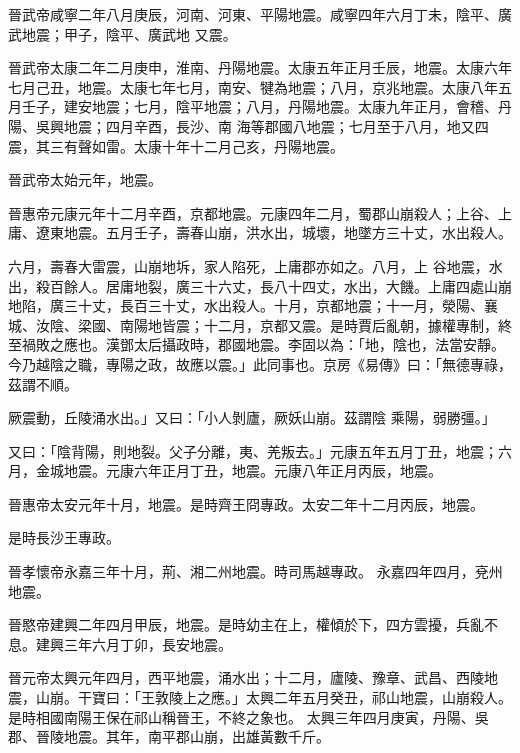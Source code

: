 \begin{pinyinscope}
 晉武帝咸寧二年八月庚辰，河南、河東、平陽地震。咸寧四年六月丁未，陰平、廣武地震；甲子，陰平、廣武地
 又震。



 晉武帝太康二年二月庚申，淮南、丹陽地震。太康五年正月壬辰，地震。太康六年七月己丑，地震。太康七年七月，南安、犍為地震；八月，京兆地震。太康八年五月壬子，建安地震；七月，陰平地震；八月，丹陽地震。太康九年正月，會稽、丹陽、吳興地震；四月辛酉，長沙、南
 海等郡國八地震；七月至于八月，地又四震，其三有聲如雷。太康十年十二月己亥，丹陽地震。



 晉武帝太始元年，地震。



 晉惠帝元康元年十二月辛酉，京都地震。元康四年二月，蜀郡山崩殺人；上谷、上庸、遼東地震。五月壬子，壽春山崩，洪水出，城壞，地墜方三十丈，水出殺人。



 六月，壽春大雷震，山崩地坼，家人陷死，上庸郡亦如之。八月，上
 谷地震，水出，殺百餘人。居庸地裂，廣三十六丈，長八十四丈，水出，大饑。上庸四處山崩地陷，廣三十丈，長百三十丈，水出殺人。十月，京都地震；十一月，滎陽、襄城、汝陰、梁國、南陽地皆震；十二月，京都又震。是時賈后亂朝，據權專制，終至禍敗之應也。漢鄧太后攝政時，郡國地震。李固以為：「地，陰也，法當安靜。今乃越陰之職，專陽之政，故應以震。」此同事也。京房《易傳》曰：「無德專祿，茲謂不順。



 厥震動，丘陵涌水出。」又曰：「小人剝廬，厥妖山崩。茲謂陰
 乘陽，弱勝彊。」



 又曰：「陰背陽，則地裂。父子分離，夷、羌叛去。」元康五年五月丁丑，地震；六月，金城地震。元康六年正月丁丑，地震。元康八年正月丙辰，地震。



 晉惠帝太安元年十月，地震。是時齊王冏專政。太安二年十二月丙辰，地震。



 是時長沙王專政。



 晉孝懷帝永嘉三年十月，荊、湘二州地震。時司馬越專政。
 永嘉四年四月，兗州地震。



 晉愍帝建興二年四月甲辰，地震。是時幼主在上，權傾於下，四方雲擾，兵亂不息。建興三年六月丁卯，長安地震。



 晉元帝太興元年四月，西平地震，涌水出；十二月，廬陵、豫章、武昌、西陵地震，山崩。干寶曰：「王敦陵上之應。」太興二年五月癸丑，祁山地震，山崩殺人。是時相國南陽王保在祁山稱晉王，不終之象也。
 太興三年四月庚寅，丹陽、吳郡、晉陵地震。其年，南平郡山崩，出雄黃數千斤。




\end{pinyinscope}
